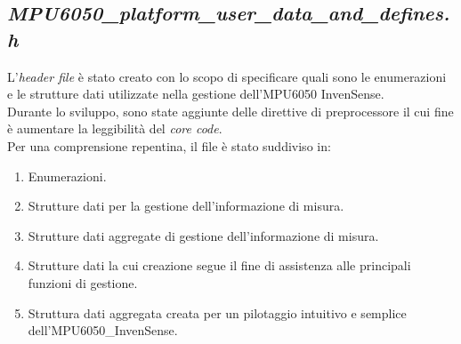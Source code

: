 \documentclass[11pt]{report}
\begin{document}
\subsection{\textit{MPU6050\_platform\_user\_data\_and\_defines.h}}
L'\textit{header file} è stato creato con lo scopo di specificare quali sono le enumerazioni e le strutture dati utilizzate nella gestione dell'MPU6050 InvenSense.\\
Durante lo sviluppo, sono state aggiunte delle direttive di preprocessore il cui fine è aumentare la leggibilità del \textit{core code}.\\
Per una comprensione repentina, il file è stato suddiviso in:
\begin{enumerate}
    \item Enumerazioni.
    \item Strutture dati per la gestione dell'informazione di misura.
    \item Strutture dati aggregate di gestione dell'informazione di misura.
    \item Strutture dati la cui creazione segue il fine di assistenza alle principali funzioni di gestione.
    \item Struttura dati aggregata creata per un pilotaggio intuitivo e semplice\\dell'MPU6050\_InvenSense.
\end{enumerate}
\end{document}
